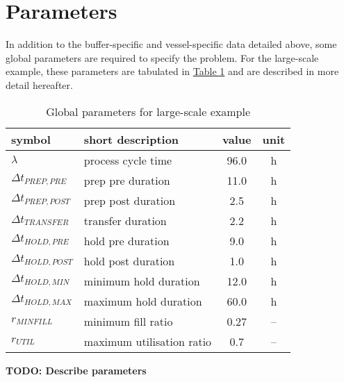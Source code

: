 \section{Parameters}\label{S.parameters}

In addition to the buffer-specific and vessel-specific data detailed above,
some global parameters are required to specify the problem.
For the large-scale example, these parameters are tabulated in
\hyperref[tbl.parameters]{Table \ref*{tbl.parameters}} and are described in
more detail hereafter.
\begin{table}[h!]
    \centering
    \caption{Global parameters for large-scale example}
    \label{tbl.parameters}
    \begin{tabular}{l | l | c | c}
        symbol & short description & value & unit\\ \hline
        $\lambda$ & process cycle time & 96.0 & h\\
        $\Delta t_{PREP,PRE}$ & prep pre duration & 11.0 & h\\
        $\Delta t_{PREP,POST}$ & prep post duration & 2.5 & h\\
        $\Delta t_{TRANSFER}$ & transfer duration & 2.2 & h\\
        $\Delta t_{HOLD,PRE}$ & hold pre duration & 9.0 & h\\
        $\Delta t_{HOLD,POST}$ & hold post duration & 1.0 & h\\
        $\Delta t_{HOLD,MIN}$ & minimum hold duration & 12.0 & h\\
        $\Delta t_{HOLD,MAX}$ & maximum hold duration & 60.0 & h\\
        $r_{MINFILL}$ & minimum fill ratio & 0.27 & --\\
        $r_{UTIL}$ & maximum utilisation ratio & 0.7 & --\\
    \end{tabular}
\end{table}

\textbf{TODO: Describe parameters}

